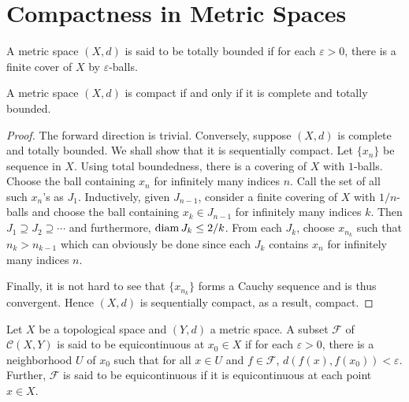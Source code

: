\section{Compactness in Metric Spaces}

\begin{definition}
    A metric space $(X,d)$ is said to be totally bounded if for each $\varepsilon > 0$, there is a finite cover of $X$ by $\varepsilon$-balls.
\end{definition}

\begin{theorem}
    A metric space $(X,d)$ is compact if and only if it is complete and totally bounded.
\end{theorem}
\begin{proof}
    The forward direction is trivial. Conversely, suppose $(X,d)$ is complete and totally bounded. We shall show that it is sequentially compact. Let $\{x_n\}$ be sequence in $X$. Using total boundedness, there is a covering of $X$ with $1$-balls. Choose the ball containing $x_n$ for infinitely many indices $n$. Call the set of all such $x_n$'s as $J_1$. Inductively, given $J_{n - 1}$, consider a finite covering of $X$ with $1/n$-balls and choose the ball containing $x_k\in J_{n - 1}$ for infinitely many indices $k$. Then $J_1\supseteq J_2\supseteq\cdots$ and furthermore, $\operatorname{diam} J_k\le 2/k$. From each $J_k$, choose $x_{n_k}$ such that $n_k > n_{k - 1}$ which can obviously be done since each $J_k$ contains $x_n$ for infinitely many indices $n$.

    Finally, it is not hard to see that $\{x_{n_k}\}$ forms a Cauchy sequence and is thus convergent. Hence $(X,d)$ is sequentially compact, as a result, compact.
\end{proof}

\begin{definition}[Equicontinuous]
    Let $X$ be a topological space and $(Y,d)$ a metric space. A subset $\mathcal F$ of $\mathcal C(X,Y)$ is said to be equicontinuous at $x_0\in X$ if for each $\varepsilon > 0$, there is a neighborhood $U$ of $x_0$ such that for all $x\in U$ and $f\in\mathcal F$, $d(f(x), f(x_0)) < \varepsilon$. Further, $\mathcal F$ is said to be equicontinuous if it is equicontinuous at each point $x\in X$.
\end{definition}

